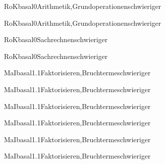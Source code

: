\documentclass[12pt]{article}
\begin{document}
    \begin{Add}{RoK}{basal0}{Arithmetik,Grundoperationen}{schwieriger}
    \solution{ }
    \end{Add}
    \begin{Add}{RoK}{basal0}{Arithmetik,Grundoperationen}{schwieriger}
    \end{Add}
    

\begin{Add}{RoK}{basal0}{Sachrechnen}{schwieriger}
\solution{ }
\end{Add}
\begin{Add}{RoK}{basal0}{Sachrechnen}{schwieriger}
\end{Add}

    \begin{Add}{MaI}{basal1.1}{Faktorisieren,Bruchterme}{schwieriger}
    \solution{ }
    \end{Add}
    \begin{Add}{MaI}{basal1.1}{Faktorisieren,Bruchterme}{schwieriger}
    \end{Add}
    

    \begin{Add}{MaI}{basal1.1}{Faktorisieren,Bruchterme}{schwieriger}
    \solution{ }
    \end{Add}
    \begin{Add}{MaI}{basal1.1}{Faktorisieren,Bruchterme}{schwieriger}
    \end{Add}
    

    \begin{Add}{MaI}{basal1.1}{Faktorisieren,Bruchterme}{schwieriger}
    \solution{ }
    \end{Add}
    \begin{Add}{MaI}{basal1.1}{Faktorisieren,Bruchterme}{schwieriger}
    \end{Add}
    
\end{document}
